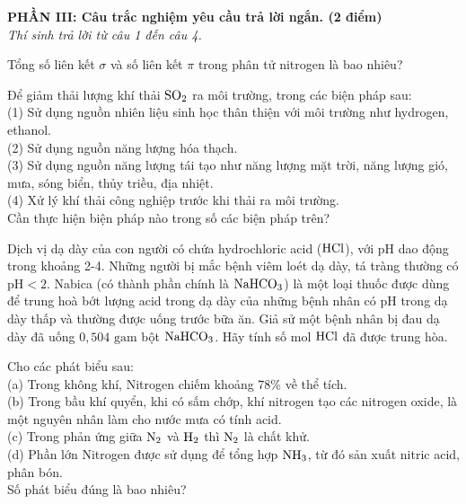 \documentclass[12pt,a4paper]{article}
\begin{document}
\bigskip
\noindent
\textbf{PHẦN III: Câu trắc nghiệm yêu cầu trả lời ngắn. (2 điểm)}\\
\textit{Thí sinh trả lời từ câu 1 đến câu 4.}

\begin{ex}
Tổng số liên kết $\sigma$ và số liên kết $\pi$ trong phân tử nitrogen là bao nhiêu?
\shortans{}
\loigiai{}
\end{ex}

\begin{ex}
Để giảm thải lượng khí thải $\ce{SO2}$ ra môi trường, trong các biện pháp sau:\\
(1) Sử dụng nguồn nhiên liệu sinh học thân thiện với môi trường như hydrogen, ethanol.\\
(2) Sử dụng nguồn năng lượng hóa thạch.\\
(3) Sử dụng nguồn năng lượng tái tạo như năng lượng mặt trời, năng lượng gió, mưa, sóng biển, thủy triều, địa nhiệt.\\
(4) Xử lý khí thải công nghiệp trước khi thải ra môi trường.\\
Cần thực hiện biện pháp nào trong số các biện pháp trên?
\shortans{}
\loigiai{}
\end{ex}

\begin{ex}
Dịch vị dạ dày của con người có chứa hydrochloric acid ($\ce{HCl}$), với pH dao động trong khoảng 2-4. Những người bị mắc bệnh viêm loét dạ dày, tá tràng thường có $\text{pH} < 2$. Nabica (có thành phần chính là $\ce{NaHCO3}$) là một loại thuốc được dùng để trung hoà bớt lượng acid trong dạ dày của những bệnh nhân có pH trong dạ dày thấp và thường được uống trước bữa ăn. Giả sử một bệnh nhân bị đau dạ dày đã uống $0{,}504\text{ gam}$ bột $\ce{NaHCO3}$. Hãy tính số mol $\ce{HCl}$ đã được trung hòa.
\shortans{}
\loigiai{}
\end{ex}

\begin{ex}
Cho các phát biểu sau:\\
(a) Trong không khí, Nitrogen chiếm khoảng 78\% về thể tích.\\
(b) Trong bầu khí quyển, khi có sấm chớp, khí nitrogen tạo các nitrogen oxide, là một nguyên nhân làm cho nước mưa có tính acid.\\
(c) Trong phản ứng giữa $\ce{N2}$ và $\ce{H2}$ thì $\ce{N2}$ là chất khử.\\
(d) Phần lớn Nitrogen được sử dụng để tổng hợp $\ce{NH3}$, từ đó sản xuất nitric acid, phân bón.\\
Số phát biểu đúng là bao nhiêu?
\shortans{}
\loigiai{}
\end{ex}
\end{document}
